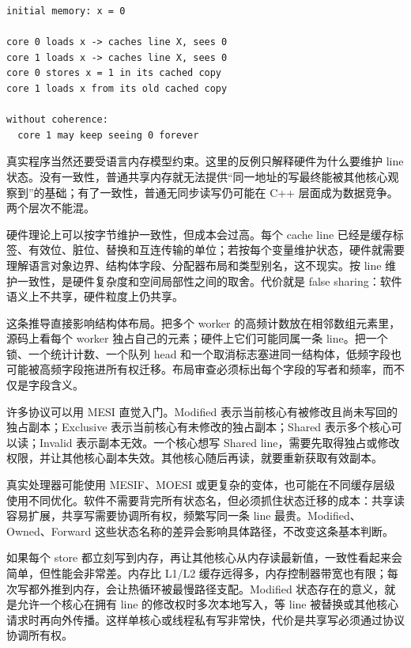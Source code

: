\begin{lstlisting}[numbers=none,caption={没有一致性规则时的反例}]
initial memory: x = 0

core 0 loads x -> caches line X, sees 0
core 1 loads x -> caches line X, sees 0
core 0 stores x = 1 in its cached copy
core 1 loads x from its old cached copy

without coherence:
  core 1 may keep seeing 0 forever
\end{lstlisting}

真实程序当然还要受语言内存模型约束。这里的反例只解释硬件为什么要维护 line 状态。没有一致性，普通共享内存就无法提供“同一地址的写最终能被其他核心观察到”的基础；有了一致性，普通无同步读写仍可能在 C++ 层面成为数据竞争。两个层次不能混。

硬件理论上可以按字节维护一致性，但成本会过高。每个 cache line 已经是缓存标签、有效位、脏位、替换和互连传输的单位；若按每个变量维护状态，硬件就需要理解语言对象边界、结构体字段、分配器布局和类型别名，这不现实。按 line 维护一致性，是硬件复杂度和空间局部性之间的取舍。代价就是 false sharing：软件语义上不共享，硬件粒度上仍共享。

这条推导直接影响结构体布局。把多个 worker 的高频计数放在相邻数组元素里，源码上看每个 worker 独占自己的元素；硬件上它们可能同属一条 line。把一个锁、一个统计计数、一个队列 head 和一个取消标志塞进同一结构体，低频字段也可能被高频字段拖进所有权迁移。布局审查必须标出每个字段的写者和频率，而不仅是字段含义。

许多协议可以用 MESI 直觉入门。Modified 表示当前核心有被修改且尚未写回的独占副本；Exclusive 表示当前核心有未修改的独占副本；Shared 表示多个核心可以读；Invalid 表示副本无效。一个核心想写 Shared line，需要先取得独占或修改权限，并让其他核心副本失效。其他核心随后再读，就要重新获取有效副本。

真实处理器可能使用 MESIF、MOESI 或更复杂的变体，也可能在不同缓存层级使用不同优化。软件不需要背完所有状态名，但必须抓住状态迁移的成本：共享读容易扩展，共享写需要协调所有权，频繁写同一条 line 最贵。Modified、Owned、Forward 这些状态名称的差异会影响具体路径，不改变这条基本判断。

如果每个 store 都立刻写到内存，再让其他核心从内存读最新值，一致性看起来会简单，但性能会非常差。内存比 L1/L2 缓存远得多，内存控制器带宽也有限；每次写都外推到内存，会让热循环被最慢路径支配。Modified 状态存在的意义，就是允许一个核心在拥有 line 的修改权时多次本地写入，等 line 被替换或其他核心请求时再向外传播。这样单核心或线程私有写非常快，代价是共享写必须通过协议协调所有权。

